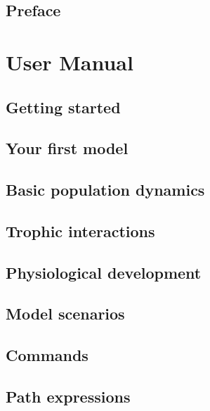 \documentclass [a4paper, 11pt, openany]  {memoir}
\begin{document}
\midsloppy
\pagestyle{ruled}
\frontmatter


\chapter{Preface}
\mainmatter

\part{User Manual}

\chapter{Getting started}

\chapter{Your first model}

\chapter{Basic population dynamics}

\chapter{Trophic interactions}

\chapter{Physiological development}

\chapter{Model scenarios}


\chapter{Commands}

\chapter{Path expressions}
\end{document}
